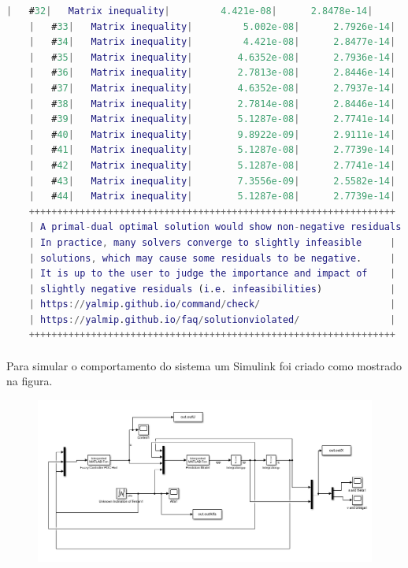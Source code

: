 \documentclass[a4paper,10pt]{article}
\begin{document}
\begin{lstlisting}[language=Matlab]
	|   #32|   Matrix inequality|         4.421e-08|      2.8478e-14|
	|   #33|   Matrix inequality|         5.002e-08|      2.7926e-14|
	|   #34|   Matrix inequality|         4.421e-08|      2.8477e-14|
	|   #35|   Matrix inequality|        4.6352e-08|      2.7936e-14|
	|   #36|   Matrix inequality|        2.7813e-08|      2.8446e-14|
	|   #37|   Matrix inequality|        4.6352e-08|      2.7937e-14|
	|   #38|   Matrix inequality|        2.7814e-08|      2.8446e-14|
	|   #39|   Matrix inequality|        5.1287e-08|      2.7741e-14|
	|   #40|   Matrix inequality|        9.8922e-09|      2.9111e-14|
	|   #41|   Matrix inequality|        5.1287e-08|      2.7739e-14|
	|   #42|   Matrix inequality|        5.1287e-08|      2.7741e-14|
	|   #43|   Matrix inequality|        7.3556e-09|      2.5582e-14|
	|   #44|   Matrix inequality|        5.1287e-08|      2.7739e-14|
	+++++++++++++++++++++++++++++++++++++++++++++++++++++++++++++++++
	| A primal-dual optimal solution would show non-negative residuals.|
	| In practice, many solvers converge to slightly infeasible     |
	| solutions, which may cause some residuals to be negative.     |
	| It is up to the user to judge the importance and impact of    |
	| slightly negative residuals (i.e. infeasibilities)            |
	| https://yalmip.github.io/command/check/                       |
	| https://yalmip.github.io/faq/solutionviolated/                |
	+++++++++++++++++++++++++++++++++++++++++++++++++++++++++++++++++
\end{lstlisting}
\paragraph{}Para simular o comportamento do sistema um Simulink foi criado como mostrado na figura.

\begin{figure}[H]
	\centering
	\includegraphics[scale = 0.6]{fig/PDCHsimulink}
\end{figure}
\end{document}

